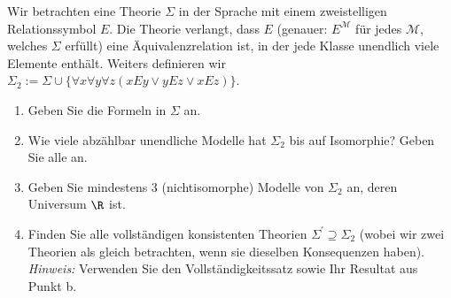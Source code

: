 
\begin{exercise}[134]

Wir betrachten eine Theorie $\Sigma$ in der Sprache mit einem zweistelligen Relationssymbol $E$.
Die Theorie verlangt, dass $E$ (genauer: $E^{\mathscr{M}}$ für jedes $\mathscr{M}$,
welches $\Sigma$ erfüllt) eine Äquivalenzrelation ist, in der jede Klasse unendlich
viele Elemente enthält. Weiters definieren wir
$\Sigma_2 := \Sigma \cup \{\forall x \forall y \forall z (xEy \lor yEz \lor xEz)\}$.
\begin{enumerate}[label = \alph*.]
  \item Geben Sie die Formeln in $\Sigma$ an.
  \item Wie viele abzählbar unendliche Modelle hat $\Sigma_2$ bis auf Isomorphie?
  Geben Sie alle an.
  \item Geben Sie mindestens 3 (nichtisomorphe) Modelle von $\Sigma_2$ an, deren
  Universum $\R$ ist.
  \item Finden Sie alle vollständigen konsistenten Theorien $\Sigma^{\prime} \supseteq \Sigma_2$
  (wobei wir zwei Theorien als gleich betrachten, wenn sie dieselben Konsequenzen haben). \\
  \textit{Hinweis:} Verwenden Sie den Vollständigkeitssatz sowie Ihr Resultat aus Punkt b.
\end{enumerate}

\end{exercise}


